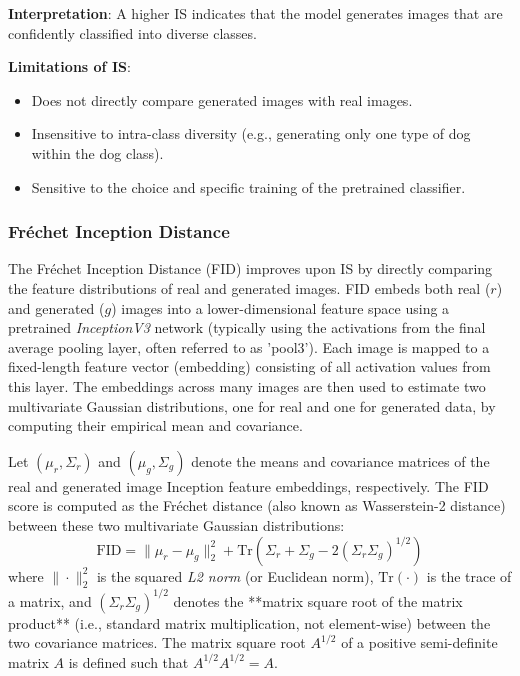 \noindent\textbf{Interpretation}:
A higher IS indicates that the model generates images that are confidently classified into diverse classes.

\noindent\textbf{Limitations of IS}:
\begin{itemize}
    \item Does not directly compare generated images with real images.
    \item Insensitive to intra-class diversity (e.g., generating only one type of dog within the dog class).
    \item Sensitive to the choice and specific training of the pretrained classifier.
\end{itemize}

\subsubsection[Fréchet Inception Distance - FID]{Fréchet Inception Distance}

The Fréchet Inception Distance (FID) \cite{heusel2018ganstrainedtimescaleupdate} improves upon IS by directly comparing the feature distributions of real and generated images. FID embeds both real (\(r\)) and generated (\(g\)) images into a lower-dimensional feature space using a pretrained \textit{InceptionV3} network (typically using the activations from the final average pooling layer, often referred to as 'pool3'). Each image is mapped to a fixed-length feature vector (embedding) consisting of all activation values from this layer. The embeddings across many images are then used to estimate two multivariate Gaussian distributions, one for real and one for generated data, by computing their empirical mean and covariance.


Let \( (\mu_r, \Sigma_r) \) and \( (\mu_g, \Sigma_g) \) denote the means and covariance matrices of the real and generated image Inception feature embeddings, respectively. The FID score is computed as the Fréchet distance (also known as Wasserstein-2 distance) between these two multivariate Gaussian distributions:
\begin{equation}
\text{FID} = \| \mu_r - \mu_g \|^2_2 + \text{Tr} \left( \Sigma_r + \Sigma_g - 2\left( \Sigma_r \Sigma_g \right)^{1/2} \right)
\end{equation}
where \( \|\cdot\|^2_2 \) is the squared \textit{L2 norm} (or Euclidean norm), \( \text{Tr}(\cdot) \) is the trace of a matrix, and \( \left( \Sigma_r \Sigma_g \right)^{1/2} \) denotes the **matrix square root of the matrix product** (i.e., standard matrix multiplication, not element-wise) between the two covariance matrices. The matrix square root \( A^{1/2} \) of a positive semi-definite matrix \( A \) is defined such that \( A^{1/2} A^{1/2} = A \).


